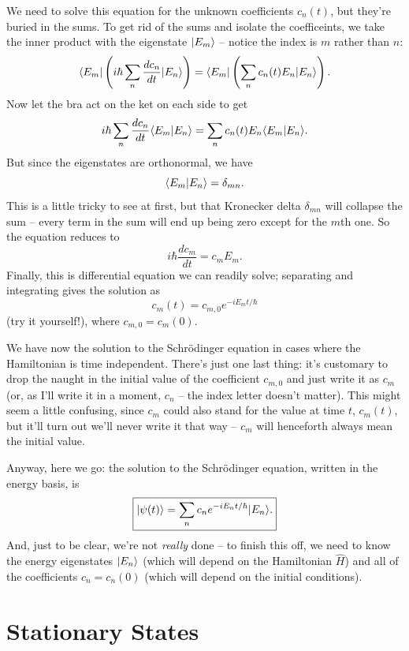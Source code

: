 We need to solve this equation for the unknown coefficients $c_n(t)$, but they're buried in the sums.  To get rid of the sums and isolate the coefficeints, we take the inner product with the eigenstate $| E_m \rangle$ -- notice the index is $m$ rather than $n$:
\[
\langle E_m | \left( i\hbar \sum_n \frac{dc_n}{dt} | E_n \rangle  \right) = \langle E_m | \left( \sum_n c_n(t) E_n | E_n \rangle \right).
\]
Now let the bra act on the ket on each side to get
\[
i\hbar \sum_n \frac{dc_n}{dt} \langle E_m | E_n \rangle = \sum_n c_n(t) E_n \langle E_m | E_n \rangle.
\]
But since the eigenstates are orthonormal, we have
\[
\langle E_m | E_n \rangle = \delta_{mn}.
\]
This is a little tricky to see at first, but that Kronecker delta $\delta_{mn}$ will collapse the sum -- every term in the sum will end up being zero except for the $m$th one.  So the equation reduces to 
\begin{equation}
\label{eq_schro_ode}
i\hbar \frac{dc_m}{dt} = c_m E_m.
\end{equation}
Finally, this is differential equation we can readily solve; separating and integrating gives the solution as
\begin{equation}
\label{eq_schro_coeff}
c_m (t) = c_{m,0} e^{-i E_m t / \hbar}
\end{equation}
(try it yourself!), where $c_{m,0} = c_m(0)$.

We have now the solution to the Schr\"odinger equation in cases where the Hamiltonian is time independent.  There's just one last thing: it's customary to drop the naught in the initial value of the coefficient $c_{m,0}$  and just write it as $c_m$ (or, as I'll write it in a moment, $c_n$ -- the index letter doesn't matter). This might seem a little confusing, since $c_m$ could also stand for the value at time $t$, $c_m(t)$, but it'll turn out we'll never write it that way -- $c_m$ will henceforth always mean the initial value.

Anyway, here we go:  the solution to the Schr\"odinger equation, written in the energy basis, is
\begin{equation}
\label{eq_schro_sol}
\boxed{
| \psi(t) \rangle = \sum_n c_n e^{-iE_n t / \hbar} | E_n \rangle.
}
\end{equation}
And, just to be clear, we're not \emph{really} done -- to finish this off, we need to know the energy eigenstates $| E_n \rangle$ (which will depend on the Hamiltonian $\hat{H}$) and all of the coefficients $c_n = c_n(0)$ (which will depend on the initial conditions).

\section{Stationary States}

